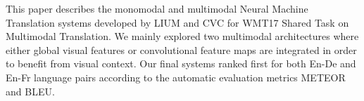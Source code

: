 This paper describes the monomodal and multimodal Neural Machine Translation systems developed by LIUM and CVC for WMT17 Shared Task on Multimodal Translation. We mainly explored two multimodal architectures where either global visual features or convolutional feature maps are integrated in order to benefit from visual context. Our final systems ranked first for both En-De and En-Fr language pairs according to the automatic evaluation metrics METEOR and BLEU.
